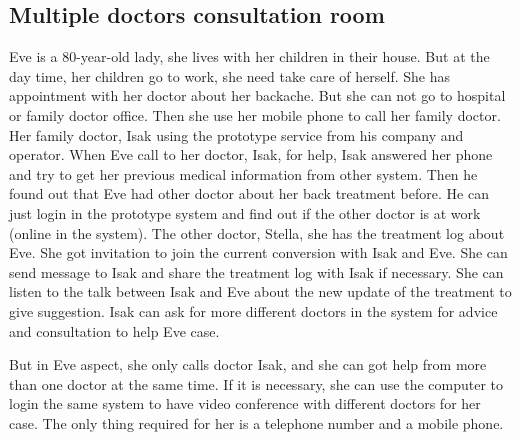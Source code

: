 \subsection{Multiple doctors consultation room}

\par Eve is a 80-year-old lady, she lives with her children in their house. But at the day time, her children go to work, she need take care of herself. She has appointment with her doctor about her backache. But she can not go to hospital or family doctor office. Then she use her mobile phone to call her family doctor. Her family doctor, Isak using the prototype service from his company and operator. When Eve call to her doctor, Isak, for help, Isak answered her phone and try to get her previous medical information from other system. Then he found out that Eve had other doctor about her back treatment before. He can just login in the prototype system and find out if the other doctor is at work (online in the system). The other doctor, Stella, she has the treatment log about Eve. She got invitation to join the current conversion with Isak and Eve. She can send message to Isak and share the treatment log with Isak if necessary. She can listen to the talk between Isak and Eve about the new update of the treatment to give suggestion. Isak can ask for more different doctors in the system for advice and consultation to help Eve case.

\par But in Eve aspect, she only calls doctor Isak, and she can got help from more than one doctor at the same time. If it is necessary, she can use the computer to login the same system to have video conference with different doctors for her case. The only thing required for her is a telephone number and a mobile phone.